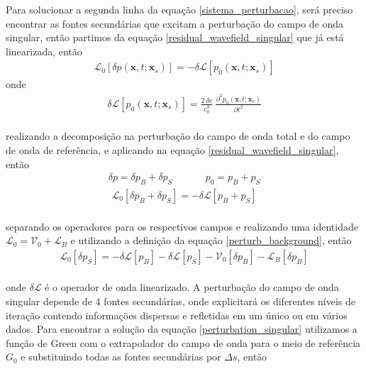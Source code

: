 Para solucionar a segunda linha da equação \ref{sistema_perturbacao}, será preciso encontrar as fontes secundárias que excitam a perturbação do campo de onda singular, então partimos da equação \ref{residual_wavefield_singular} que já está linearizada, então \\
\begin{eqnarray}
\nonumber
 \mathcal{L}_{0} [\delta p (\mathbf{x},t;\mathbf{x}_{s}) ] = - \delta \mathcal{L} [ p_{0}(\mathbf{x},t;\mathbf{x}_{s}) ]
 \end{eqnarray}
 onde 
 \begin{eqnarray}
 \nonumber
 \delta \mathcal{L} [ p_{0}(\mathbf{x},t;\mathbf{x}_{s}) ]=  \frac{2~\delta c}{c_{0}^{3}}~\frac{\partial^{2} p_{0}(\mathbf{x},t;\mathbf{x}_{s})}{\partial t^{2}}
 \end{eqnarray}
\\
realizando a decomposição na perturbação do campo de onda total e do campo de onda de referência, e aplicando na equação \ref{residual_wavefield_singular}, então \\
\begin{eqnarray}
 \nonumber
 \delta p = \delta p_{B} + \delta p_{S} ~~~~~~~ ~~~~~~~~   p_{0} = p_{B} + p_{S} 
\end{eqnarray}
\begin{eqnarray}
 \mathcal{L}_{0} [\delta p_{B} + \delta p_{S} ] = -\delta \mathcal{L} [ p_{B} + p_{S} ]
\end{eqnarray}
\\
separando os operadores para os respectivos campos e realizando uma identidade $\mathcal{L}_{0} = \mathcal{V}_{0} + \mathcal{L}_{B}$ e utilizando a definição da equação \ref{perturb_background}, então \\
\begin{eqnarray}
 \mathcal{L}_{0} [\delta p_{S} ] = - \delta \mathcal{L} [ p_{B}]  - \delta\mathcal{L}[ p_{S} ] - \mathcal{V}_{0} [\delta p_{B}] - \mathcal{L}_{B}[\delta p_{B}] 
 \label{perturbation_singular}
\end{eqnarray}
\\
onde $\delta \mathcal{L}$ é o operador de onda linearizado. A perturbação do campo de onda singular depende de 4 fontes secundárias, onde explicitará os diferentes níveis de iteração contendo informações dispersas e refletidas em um único ou em vários dados. Para encontrar a solução da equação \ref{perturbation_singular} utilizamos a função de Green com o extrapolador do campo de onda para o meio de referência $G_{0}$ e substituindo todas as fontes secundárias por $\Delta s$, então \\
